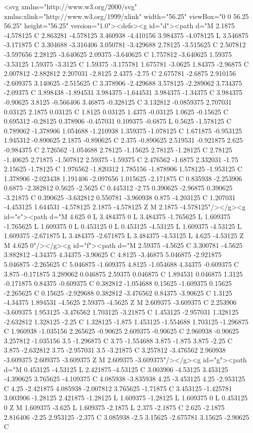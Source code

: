 {{{{{{{<svg xmlns="http://www.w3.org/2000/svg" xmlns:xlink="http://www.w3.org/1999/xlink" width="56.25" viewBox="0 0 56.25 56.25" height="56.25" version="1.0"><defs><g id="d"><path d="M 2.1875 -4.578125 C 2.863281 -4.578125 3.460938 -4.410156 3.984375 -4.078125 L 3.546875 -3.171875 C 3.304688 -3.316406 3.050781 -3.429688 2.78125 -3.515625 C 2.507812 -3.597656 2.28125 -3.640625 2.09375 -3.640625 C 1.757812 -3.640625 1.59375 -3.53125 1.59375 -3.3125 C 1.59375 -3.175781 1.675781 -3.0625 1.84375 -2.96875 C 2.007812 -2.882812 2.207031 -2.8125 2.4375 -2.75 C 2.675781 -2.6875 2.910156 -2.609375 3.140625 -2.515625 C 3.378906 -2.429688 3.578125 -2.289062 3.734375 -2.09375 C 3.898438 -1.894531 3.984375 -1.644531 3.984375 -1.34375 C 3.984375 -0.90625 3.8125 -0.566406 3.46875 -0.328125 C 3.132812 -0.0859375 2.707031 0.03125 2.1875 0.03125 C 1.8125 0.03125 1.4375 -0.03125 1.0625 -0.15625 C 0.695312 -0.28125 0.378906 -0.457031 0.109375 -0.6875 L 0.5625 -1.578125 C 0.789062 -1.378906 1.054688 -1.210938 1.359375 -1.078125 C 1.671875 -0.953125 1.945312 -0.890625 2.1875 -0.890625 C 2.375 -0.890625 2.519531 -0.921875 2.625 -0.984375 C 2.726562 -1.054688 2.78125 -1.15625 2.78125 -1.28125 C 2.78125 -1.40625 2.71875 -1.507812 2.59375 -1.59375 C 2.476562 -1.6875 2.332031 -1.75 2.15625 -1.78125 C 1.976562 -1.820312 1.785156 -1.878906 1.578125 -1.953125 C 1.378906 -2.023438 1.191406 -2.097656 1.015625 -2.171875 C 0.835938 -2.253906 0.6875 -2.382812 0.5625 -2.5625 C 0.445312 -2.75 0.390625 -2.96875 0.390625 -3.21875 C 0.390625 -3.632812 0.550781 -3.960938 0.875 -4.203125 C 1.207031 -4.453125 1.644531 -4.578125 2.1875 -4.578125 Z M 2.1875 -4.578125"/></g><g id="e"><path d="M 4.625 0 L 3.484375 0 L 3.484375 -1.765625 L 1.609375 -1.765625 L 1.609375 0 L 0.453125 0 L 0.453125 -4.53125 L 1.609375 -4.53125 L 1.609375 -2.671875 L 3.484375 -2.671875 L 3.484375 -4.53125 L 4.625 -4.53125 Z M 4.625 0"/></g><g id="f"><path d="M 2.59375 -4.5625 C 3.300781 -4.5625 3.882812 -4.34375 4.34375 -3.90625 C 4.8125 -3.46875 5.046875 -2.921875 5.046875 -2.265625 C 5.046875 -1.609375 4.8125 -1.054688 4.34375 -0.609375 C 3.875 -0.171875 3.289062 0.046875 2.59375 0.046875 C 1.894531 0.046875 1.3125 -0.171875 0.84375 -0.609375 C 0.382812 -1.054688 0.15625 -1.609375 0.15625 -2.265625 C 0.15625 -2.929688 0.382812 -3.476562 0.84375 -3.90625 C 1.3125 -4.34375 1.894531 -4.5625 2.59375 -4.5625 Z M 2.609375 -3.609375 C 2.253906 -3.609375 1.953125 -3.476562 1.703125 -3.21875 C 1.453125 -2.957031 1.328125 -2.632812 1.328125 -2.25 C 1.328125 -1.875 1.453125 -1.554688 1.703125 -1.296875 C 1.960938 -1.035156 2.265625 -0.90625 2.609375 -0.90625 C 2.960938 -0.90625 3.257812 -1.035156 3.5 -1.296875 C 3.75 -1.554688 3.875 -1.875 3.875 -2.25 C 3.875 -2.632812 3.75 -2.957031 3.5 -3.21875 C 3.257812 -3.476562 2.960938 -3.609375 2.609375 -3.609375 Z M 2.609375 -3.609375"/></g><g id="g"><path d="M 0.453125 -4.53125 L 2.421875 -4.53125 C 3.003906 -4.53125 3.453125 -4.390625 3.765625 -4.109375 C 4.085938 -3.835938 4.25 -3.453125 4.25 -2.953125 C 4.25 -2.421875 4.085938 -2.007812 3.765625 -1.71875 C 3.453125 -1.425781 3.003906 -1.28125 2.421875 -1.28125 L 1.609375 -1.28125 L 1.609375 0 L 0.453125 0 Z M 1.609375 -3.625 L 1.609375 -2.1875 L 2.375 -2.1875 C 2.625 -2.1875 2.816406 -2.25 2.953125 -2.375 C 3.085938 -2.5 3.15625 -2.675781 3.15625 -2.90625 C }}}}}}}
